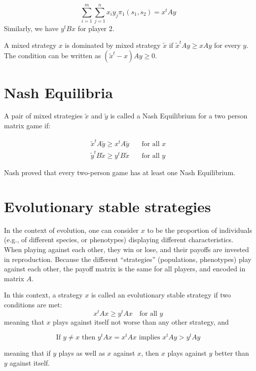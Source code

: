 \documentclass[
]{book}
\begin{document}
\[
\sum_{i=1}^m \sum_{j = 1}^n x_i y_j \pi_1 (s_1, s_2) = x^t A y
\]
Similarly, we have \(y^t B x\) for player 2.

A mixed strategy \(x\) is dominated by mixed strategy \(\tilde{x}\) if \(\tilde{x}^t A y \geq x A y\) for every \(y\). The condition can be written as \((\tilde{x}^t - x) A y \geq 0\).

\hypertarget{nash-equilibria}{%
\section{Nash Equilibria}\label{nash-equilibria}}

A pair of mixed strategies \(\tilde{x}\) and \(\tilde{y}\) is called a Nash Equilibrium for a two person matrix game if:

\[
\begin{aligned}
\tilde{x}^t A \tilde{y} \geq x^t A \tilde{y} &\quad \text{for all } x\\
\tilde{y}^t B \tilde{x} \geq y^t B \tilde{x} &\quad \text{for all } y
\end{aligned}
\]

Nash proved that every two-person game has at least one Nash Equilibrium.

\hypertarget{evolutionary-stable-strategies}{%
\section{Evolutionary stable strategies}\label{evolutionary-stable-strategies}}

In the context of evolution, one can consider \(x\) to be the proportion of individuals (e.g., of different species, or phenotypes) displaying different characteristics. When playing against each other, they win or lose, and their payoffs are invested in reproduction. Because the different ``strategies'' (populations, phenotypes) play against each other, the payoff matrix is the same for all players, and encoded in matrix \(A\).

In this context, a strategy \(x\) is called an evolutionary stable strategy if two conditions are met:
\[
x^t A x \geq y^t A x \quad \text{for all } y
\]
meaning that \(x\) plays against itself not worse than any other strategy, and

\[
\text{If } y \neq x \text{ then } y^t A x = x^t A x \text{ implies } x^t A y > y^t A y
\]

meaning that if \(y\) plays as well as \(x\) against \(x\), then \(x\) plays against \(y\) better than \(y\) against itself.
\end{document}
